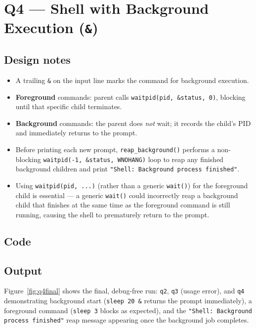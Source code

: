 \documentclass[12pt,a4paper]{article}
\begin{document}
\section{Q4 --- Shell with Background Execution (\texttt{\&})}

\subsection*{Design notes}
\begin{itemize}
    \item A trailing \texttt{\&} on the input line marks the command for background execution.
    \item \textbf{Foreground} commands: parent calls \texttt{waitpid(pid, \&status, 0)},
          blocking until that specific child terminates.
    \item \textbf{Background} commands: the parent does \emph{not} wait; it records the
          child's PID and immediately returns to the prompt.
    \item Before printing each new prompt, \texttt{reap\_background()} performs a
          non-blocking \texttt{waitpid(-1, \&status, WNOHANG)} loop to reap any finished
          background children and print \texttt{"Shell: Background process finished"}.
    \item Using \texttt{waitpid(pid, ...)} (rather than a generic \texttt{wait()}) for the
          foreground child is essential --- a generic \texttt{wait()} could incorrectly
          reap a background child that finishes at the same time as the foreground
          command is still running, causing the shell to prematurely return to the prompt.
\end{itemize}

\subsection*{Code}


\subsection*{Output}
Figure~\ref{fig:q4final} shows the final, debug-free run: \texttt{q2}, \texttt{q3}
(usage error), and \texttt{q4} demonstrating background start
(\texttt{sleep 20 \&} returns the prompt immediately), a foreground command
(\texttt{sleep 3} blocks as expected), and the \texttt{"Shell: Background process finished"}
reap message appearing once the background job completes.
\end{document}
